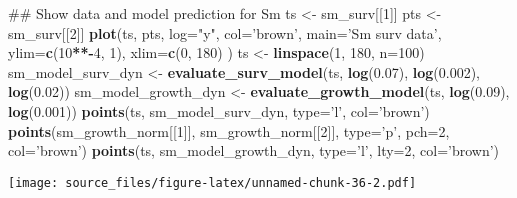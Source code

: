 \documentclass[]{article}
\newenvironment{Shaded}{\begin{snugshade}}{\end{snugshade}}
\newcommand{\KeywordTok}[1]{\textcolor[rgb]{0.13,0.29,0.53}{\textbf{#1}}}
\newcommand{\DataTypeTok}[1]{\textcolor[rgb]{0.13,0.29,0.53}{#1}}
\newcommand{\DecValTok}[1]{\textcolor[rgb]{0.00,0.00,0.81}{#1}}
\newcommand{\FloatTok}[1]{\textcolor[rgb]{0.00,0.00,0.81}{#1}}
\newcommand{\StringTok}[1]{\textcolor[rgb]{0.31,0.60,0.02}{#1}}
\newcommand{\OperatorTok}[1]{\textcolor[rgb]{0.81,0.36,0.00}{\textbf{#1}}}
\newcommand{\NormalTok}[1]{#1}
\begin{document}
\begin{Shaded}
\begin{Highlighting}[]
\NormalTok{## Show data and model prediction for Sm}
\NormalTok{ts <-}\StringTok{ }\NormalTok{sm_surv[[}\DecValTok{1}\NormalTok{]]}
\NormalTok{pts <-}\StringTok{ }\NormalTok{sm_surv[[}\DecValTok{2}\NormalTok{]]}
\KeywordTok{plot}\NormalTok{(ts, pts, }
     \DataTypeTok{log=}\StringTok{"y"}\NormalTok{, }
     \DataTypeTok{col=}\StringTok{'brown'}\NormalTok{, }
     \DataTypeTok{main=}\StringTok{'Sm surv data'}\NormalTok{, }
     \DataTypeTok{ylim=}\KeywordTok{c}\NormalTok{(}\DecValTok{10}\OperatorTok{**-}\DecValTok{4}\NormalTok{, }\DecValTok{1}\NormalTok{),}
     \DataTypeTok{xlim=}\KeywordTok{c}\NormalTok{(}\DecValTok{0}\NormalTok{, }\DecValTok{180}\NormalTok{)}
\NormalTok{     )}
\NormalTok{ts <-}\StringTok{ }\KeywordTok{linspace}\NormalTok{(}\DecValTok{1}\NormalTok{, }\DecValTok{180}\NormalTok{, }\DataTypeTok{n=}\DecValTok{100}\NormalTok{)}
\NormalTok{sm_model_surv_dyn <-}\StringTok{ }\KeywordTok{evaluate_surv_model}\NormalTok{(ts, }\KeywordTok{log}\NormalTok{(}\FloatTok{0.07}\NormalTok{), }\KeywordTok{log}\NormalTok{(}\FloatTok{0.002}\NormalTok{), }\KeywordTok{log}\NormalTok{(}\FloatTok{0.02}\NormalTok{))}
\NormalTok{sm_model_growth_dyn <-}\StringTok{ }\KeywordTok{evaluate_growth_model}\NormalTok{(ts, }\KeywordTok{log}\NormalTok{(}\FloatTok{0.09}\NormalTok{), }\KeywordTok{log}\NormalTok{(}\FloatTok{0.001}\NormalTok{))}
\KeywordTok{points}\NormalTok{(ts, sm_model_surv_dyn, }\DataTypeTok{type=}\StringTok{'l'}\NormalTok{, }\DataTypeTok{col=}\StringTok{'brown'}\NormalTok{)}
\KeywordTok{points}\NormalTok{(sm_growth_norm[[}\DecValTok{1}\NormalTok{]], sm_growth_norm[[}\DecValTok{2}\NormalTok{]], }\DataTypeTok{type=}\StringTok{'p'}\NormalTok{, }\DataTypeTok{pch=}\DecValTok{2}\NormalTok{, }\DataTypeTok{col=}\StringTok{'brown'}\NormalTok{)}
\KeywordTok{points}\NormalTok{(ts, sm_model_growth_dyn, }\DataTypeTok{type=}\StringTok{'l'}\NormalTok{, }\DataTypeTok{lty=}\DecValTok{2}\NormalTok{, }\DataTypeTok{col=}\StringTok{'brown'}\NormalTok{)}
\end{Highlighting}
\end{Shaded}

\texttt{[image: source\_files/figure-latex/unnamed-chunk-36-2.pdf]}
\end{document}
